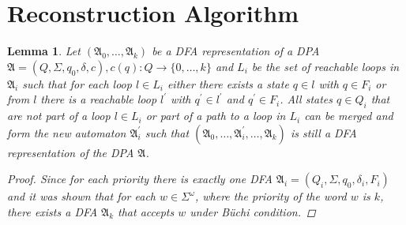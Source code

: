 \documentclass[10pt]{article}
\theoremstyle{definition}
\theoremstyle{plain}
\newtheorem{lemma}{Lemma}
\theoremstyle{remark}
\begin{document}
\section{Reconstruction Algorithm}

  \begin{lemma}
    Let $(\mathfrak{A}_0,\dots,\mathfrak{A}_k)$ be a DFA representation of a DPA
    $\mathfrak{A}=(Q,\Sigma,q_0,\delta,c),c(q):Q\rightarrow \{0,\dots, k\}$ and
    $L_i$ be the set of reachable loops in $\mathfrak{A}_i$ such that for each
    loop $l\in L_i$ either there exists a state $q\in l$ with $q\in F_i$ or from
    $l$ there is a reachable loop $l^\prime$ with $q^\prime \in l^\prime$ and 
    $q^\prime \in F_i$.
    All states $q\in Q_i$ that are not part of a loop $l\in L_i$ or part of a
    path to a loop in $L_i$ can be merged and form the new automaton
    $\mathfrak{A}_i^\prime$ such that $(\mathfrak{A}_0,\dots,\mathfrak{A}_i^\prime,
    \dots,\mathfrak{A}_k)$ is still a DFA representation of the DPA $\mathfrak{A}$.

    \begin{proof}
      Since for each priority there is exactly one DFA
      $\mathfrak{A}_i=(Q_i,\Sigma,q_0,\delta_i,F_i)$ and it was shown that for
      each $w\in \Sigma^\omega$, where the priority of the word $w$ is $k$,
      there exists a DFA $\mathfrak{A}_k$ that accepts $w$ under Büchi
      condition.

    \end{proof}
  \end{lemma}
\end{document}
